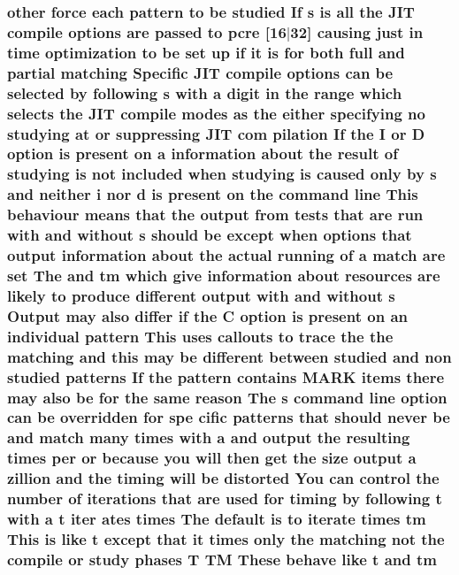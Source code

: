 \subsubsection[{\texorpdfstring{tm}{tm}}]{ other force each {\bf pattern} {\bf to} {\bf be} {\bf studied} If {\bf s} {\bf is} {\bf all} the J\+IT {\bf compile} {\bf options} {\bf are} passed {\bf to} {\bf pcre} \mbox{[}16$\vert$32\mbox{]} causing just {\bf in} {\bf time} optimization {\bf to} {\bf be} {\bf set} up {\bf if} {\bf it} {\bf is} for both full and {\bf partial} {\bf matching} Specific J\+IT {\bf compile} {\bf options} {\bf can} {\bf be} {\bf selected} by following {\bf s} {\bf with} {\bf a} digit {\bf in} the range {\bf which} selects the J\+IT {\bf compile} {\bf modes} {\bf as} the either {\bf specifying} no {\bf studying} at {\bf or} suppressing J\+IT com pilation If the {\bf I} {\bf or} {\bf D} {\bf option} {\bf is} {\bf present} {\bf on} {\bf a} information about the {\bf result} {\bf of} {\bf studying} {\bf is} {\bf not} {\bf included} when {\bf studying} {\bf is} caused only by {\bf s} and neither {\bf i} nor {\bf d} {\bf is} {\bf present} {\bf on} the {\bf command} {\bf line} This behaviour means that the {\bf output} {\bf from} {\bf tests} that {\bf are} {\bf run} {\bf with} and without {\bf s} should {\bf be} {\bf except} when {\bf options} that {\bf output} information about the actual running {\bf of} {\bf a} {\bf match} {\bf are} {\bf set} The and tm {\bf which} give information about resources {\bf are} likely {\bf to} produce different {\bf output} {\bf with} and without {\bf s} Output may also differ {\bf if} the {\bf C} {\bf option} {\bf is} {\bf present} {\bf on} an individual {\bf pattern} This uses callouts {\bf to} trace the the {\bf matching} and {\bf this} may {\bf be} different between {\bf studied} and non {\bf studied} {\bf patterns} If the {\bf pattern} {\bf contains} M\+A\+RK items there may also {\bf be} for the same {\bf reason} The {\bf s} {\bf command} {\bf line} {\bf option} {\bf can} {\bf be} overridden for spe cific {\bf patterns} that should never {\bf be} and {\bf match} many {\bf times} {\bf with} {\bf a} and {\bf output} the resulting {\bf times} per {\bf or} because you will then get the {\bf size} {\bf output} {\bf a} zillion and the timing will {\bf be} distorted You {\bf can} control the {\bf number} {\bf of} iterations that {\bf are} {\bf used} for timing by following {\bf t} {\bf with} {\bf a} {\bf t} {\bf iter} ates {\bf times} The {\bf default} {\bf is} {\bf to} iterate {\bf times} tm This {\bf is} like {\bf t} {\bf except} that {\bf it} {\bf times} only the {\bf matching} {\bf not} the {\bf compile} {\bf or} {\bf study} phases {\bf T} TM These behave like {\bf t} and tm}\hypertarget{pcretest_8txt_aa2e3274466b5ab2887d8d52dd8a50e8d}{}\label{pcretest_8txt_aa2e3274466b5ab2887d8d52dd8a50e8d}
